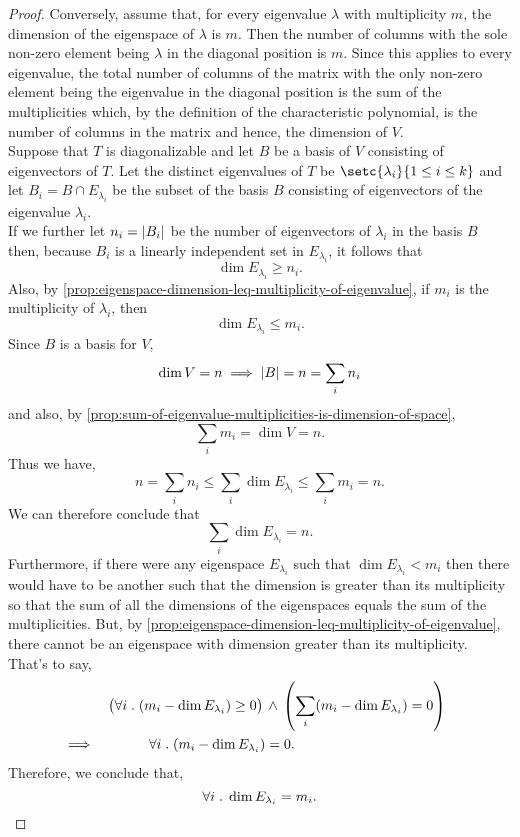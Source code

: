 \documentclass[../MathsNotesBase.tex]{subfiles}
\begin{document}
{\begin{proof}
			Conversely, assume that, for every eigenvalue $\lambda$ with multiplicity $m$, the dimension of the eigenspace of $\lambda$ is $m$. Then the number of columns with the sole non-zero element being $\lambda$ in the diagonal position is $m$. Since this applies to every eigenvalue, the total number of columns of the matrix with the only non-zero element being the eigenvalue in the diagonal position is the sum of the multiplicities which, by the definition of the characteristic polynomial, is the number of columns in the matrix and hence, the dimension of $V$.\\
			
			Suppose that $T$ is diagonalizable and let $B$ be a basis of $V$ consisting of eigenvectors of $T$. Let the distinct eigenvalues of $T$ be ${ \setc{\lambda_i}{1 \leq i \leq k} }$ and let ${ B_i = B \cap E_{\lambda_i} }$ be the subset of the basis $B$ consisting of eigenvectors of the eigenvalue $\lambda_i$.\\
			If we further let ${ n_i = \left\lvert B_i\right\rvert }$ be the number of eigenvectors of $\lambda_i$ in the basis $B$ then, because $B_i$ is a linearly independent set in $E_{\lambda_i}$, it follows that
			\[ \dim E_{\lambda_i} \geq n_i. \]
			Also, by \autoref{prop:eigenspace-dimension-leq-multiplicity-of-eigenvalue}, if $m_i$ is the multiplicity of $\lambda_i$, then
			\[ \dim E_{\lambda_i} \leq m_i. \]
			Since $B$ is a basis for $V$,
			\[ \dim V = n \implies \left\lvert B\right\rvert = n = \sum_i n_i \]
			and also, by \autoref{prop:sum-of-eigenvalue-multiplicities-is-dimension-of-space},
			\[ \sum_i m_i = \dim V = n. \]
			Thus we have,
			\[ n = \sum_i n_i \leq \sum_i \dim E_{\lambda_i} \leq \sum_i m_i = n. \]
			We can therefore conclude that
			\[ \sum_i \dim E_{\lambda_i} = n. \]
			Furthermore, if there were any eigenspace $E_{\lambda_i}$ such that ${ \dim E_{\lambda_i} < m_i }$ then there would have to be another such that the dimension is greater than its multiplicity so that the sum of all the dimensions of the eigenspaces equals the sum of the multiplicities. But, by \autoref{prop:eigenspace-dimension-leq-multiplicity-of-eigenvalue}, there cannot be an eigenspace with dimension greater than its multiplicity. That's to say,
			\[\begin{aligned}
				&& \left( \forall i \;.\; (m_i - \dim E_{\lambda_i}) \geq 0 \right) \, &\land \, \left( \sum_i (m_i - \dim E_{\lambda_i}) = 0 \right) \\
				&\implies & \forall i \;.\; (m_i - \dim E_{\lambda_i}) &= 0. &\text{\scriptsize{}} \\
			\end{aligned}\]			
			Therefore, we conclude that,
			\[ \forall i \;.\; \dim E_{\lambda_i} = m_i. \]
			

\end{proof}}
\end{document}
